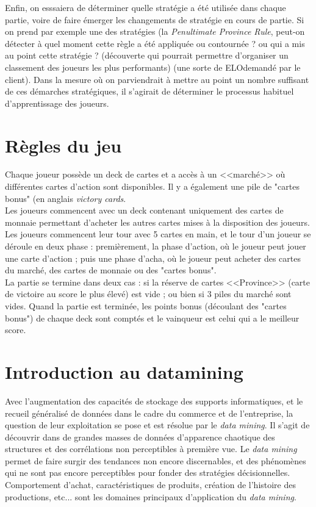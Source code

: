 Enfin, on esssaiera de déterminer quelle stratégie a été utilisée dans chaque partie, voire de faire émerger les changements de stratégie en cours de partie. Si on prend par exemple une des stratégies (la \textit{Penultimate Province Rule}, peut-on détecter à quel moment cette règle a été appliquée ou contournée ? ou qui a mis au point cette stratégie ? (découverte qui pourrait permettre d'organiser un classement des joueurs les plus performants) (une sorte de ELO\footnotemark demandé par le client). Dans la mesure où on parviendrait à mettre au point un nombre suffisant de ces démarches stratégiques, il s'agirait de déterminer le processus habituel d'apprentissage des joueurs.


\section{Règles du jeu}
Chaque joueur possède un deck de cartes et a accès à un <<marché>> où différentes cartes d'action sont disponibles. Il y a également une pile de "cartes bonus" (en anglais \textit{victory cards}.\\

Les joueurs commencent avec un deck contenant uniquement des cartes de monnaie permettant d'acheter les autres cartes mises à la disposition des joueurs. Les joueurs commencent leur tour avec 5 cartes en main, et le tour d'un joueur se déroule en deux phase : premièrement, la phase d'action, où le joueur peut jouer une carte d'action ; puis une phase d'acha, où le joueur peut acheter des cartes du marché, des cartes de monnaie ou des "cartes bonus".\\

La partie se termine dans deux cas : si la réserve de cartes <<Province>> (carte de victoire au score le plus élevé) est vide ; ou bien si 3 piles du marché sont vides. Quand la partie est terminée, les points bonus (découlant des "cartes bonus") de chaque deck sont comptés et le vainqueur est celui qui a le meilleur score.

\section{Introduction au datamining}
Avec l'augmentation des capacités de stockage des supports informatiques, et le recueil généralisé de données dans le cadre du commerce et de l'entreprise, la question de leur exploitation se pose et est résolue par le \textit{data mining}.
Il s'agit de découvrir dans de grandes masses de données d'apparence chaotique des structures et des corrélations non perceptibles à première vue. Le \textit{data mining} permet de faire surgir des tendances non encore discernables, et des phénomènes qui ne sont pas encore perceptibles pour fonder des stratégies décisionnelles. Comportement d'achat, caractéristiques de produits, création de l'histoire des productions, etc... sont les domaines principaux d'application du \textit{data mining}.


